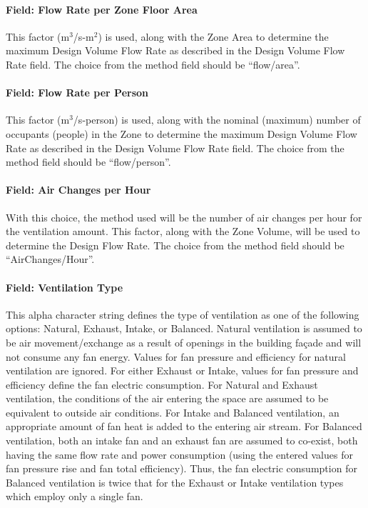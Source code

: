 \paragraph{Field: Flow Rate per Zone Floor Area}\label{field-flow-rate-per-zone-floor-area}

This factor (m\(^{3}\)/s-m\(^{2}\)) is used, along with the Zone Area to determine the maximum Design Volume Flow Rate as described in the Design Volume Flow Rate field. The choice from the method field should be ``flow/area''.

\paragraph{Field: Flow Rate per Person}\label{field-flow-rate-per-person}

This factor (m\(^{3}\)/s-person) is used, along with the nominal (maximum) number of occupants (people) in the Zone to determine the maximum Design Volume Flow Rate as described in the Design Volume Flow Rate field. The choice from the method field should be ``flow/person''.

\paragraph{Field: Air Changes per Hour}\label{field-air-changes-per-hour-1}

With this choice, the method used will be the number of air changes per hour for the ventilation amount. This factor, along with the Zone Volume, will be used to determine the Design Flow Rate. The choice from the method field should be ``AirChanges/Hour''.

\paragraph{Field: Ventilation Type}\label{field-ventilation-type}

This alpha character string defines the type of ventilation as one of the following options: Natural, Exhaust, Intake, or Balanced. Natural ventilation is assumed to be air movement/exchange as a result of openings in the building façade and will not consume any fan energy. Values for fan pressure and efficiency for natural ventilation are ignored. For either Exhaust or Intake, values for fan pressure and efficiency define the fan electric consumption. For Natural and Exhaust ventilation, the conditions of the air entering the space are assumed to be equivalent to outside air conditions. For Intake and Balanced ventilation, an appropriate amount of fan heat is added to the entering air stream. For Balanced ventilation, both an intake fan and an exhaust fan are assumed to co-exist, both having the same flow rate and power consumption (using the entered values for fan pressure rise and fan total efficiency). Thus, the fan electric consumption for Balanced ventilation is twice that for the Exhaust or Intake ventilation types which employ only a single fan.

